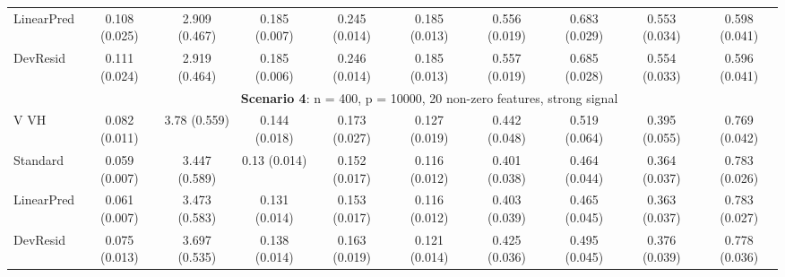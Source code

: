 \documentclass{article}
\begin{document}
\begin{landscape}
\begin{table}[ht]
\begin{tabular}[t]{lccccccccc}
LinearPred  & 0.108 (0.025) & 2.909 (0.467) & 0.185 (0.007) & 0.245 (0.014) & 0.185 (0.013) & 0.556 (0.019) & 0.683 (0.029) & 0.553 (0.034) & 0.598 (0.041) \\  
DevResid  & 0.111 (0.024) & 2.919 (0.464) & 0.185 (0.006) & 0.246 (0.014) & 0.185 (0.013) & 0.557 (0.019) & 0.685 (0.028) & 0.554 (0.033) & 0.596 (0.041) \\
\addlinespace
&\multicolumn{9}{c}{\textbf{Scenario 4}: n = 400, p = 10000, 20 non-zero features, strong signal}\\
\cline{2-10}
V VH  & 0.082 (0.011) & 3.78 (0.559) & 0.144 (0.018) & 0.173 (0.027) & 0.127 (0.019) & 0.442 (0.048) & 0.519 (0.064) & 0.395 (0.055) & 0.769 (0.042) \\ 
Standard  & 0.059 (0.007) & 3.447 (0.589) & 0.13 (0.014) & 0.152 (0.017) & 0.116 (0.012) & 0.401 (0.038) & 0.464 (0.044) & 0.364 (0.037) & 0.783 (0.026) \\    
 LinearPred  & 0.061 (0.007) & 3.473 (0.583) & 0.131 (0.014) & 0.153 (0.017) & 0.116 (0.012) & 0.403 (0.039) & 0.465 (0.045) & 0.363 (0.037) & 0.783 (0.027) \\ 
 DevResid  & 0.075 (0.013) & 3.697 (0.535) & 0.138 (0.014) & 0.163 (0.019) & 0.121 (0.014) & 0.425 (0.036) & 0.495 (0.045) & 0.376 (0.039) & 0.778 (0.036) \\
\bottomrule
\end{tabular}
\end{table}


\end{landscape}
\end{document}
